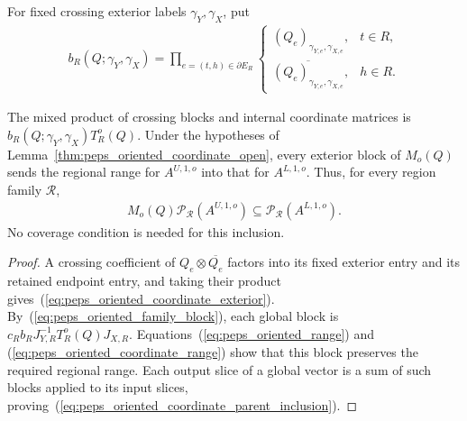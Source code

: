 \begin{definition}%
    \label{def:peps_oriented_coordinate_exterior}
    \leanok
    For fixed crossing exterior labels $\gamma_Y,\gamma_X$, put
    \begin{align}
        b_R(Q;\gamma_Y,\gamma_X)
        =\prod_{e=(t,h)\in\partial E_R}
        \begin{cases}
            (Q_e)_{\gamma_{Y,e},\gamma_{X,e}},            & t\in R, \\
            \overline{(Q_e)_{\gamma_{Y,e},\gamma_{X,e}}}, & h\in R.
        \end{cases}
        \label{eq:peps_oriented_coordinate_exterior}
    \end{align}
\end{definition}

\begin{lemma}%
    \label{thm:peps_oriented_coordinate_blocks}
    \leanok
    The mixed product of crossing blocks and internal coordinate matrices
    is $b_R(Q;\gamma_Y,\gamma_X)T_R^o(Q)$.
    Under the hypotheses of
    Lemma~\ref{thm:peps_oriented_coordinate_open}, every exterior
    block of $M_o(Q)$ sends the regional range for $A^{U,1,o}$ into
    that for $A^{L,1,o}$. Thus, for every region family $\mathcal R$,
    \begin{align}
        M_o(Q)\mathcal P_{\mathcal R}(A^{U,1,o})
        \subseteq\mathcal P_{\mathcal R}(A^{L,1,o}).
        \label{eq:peps_oriented_coordinate_parent_inclusion}
    \end{align}
    No coverage condition is needed for this inclusion.
\end{lemma}
\begin{proof}\leanok
    A crossing coefficient of $Q_e\otimes\overline{Q_e}$ factors
    into its fixed exterior entry and its retained endpoint entry, and
    taking their product gives~(\ref{eq:peps_oriented_coordinate_exterior}).
    By~(\ref{eq:peps_oriented_family_block}), each global block is
    $c_Rb_RJ_{Y,R}^{-1}T_R^o(Q)J_{X,R}$.
    Equations~(\ref{eq:peps_oriented_range}) and
    (\ref{eq:peps_oriented_coordinate_range}) show that this block
    preserves the required regional range. Each output slice of a
    global vector is a sum of such blocks applied to its input slices,
    proving~(\ref{eq:peps_oriented_coordinate_parent_inclusion}).
\end{proof}

